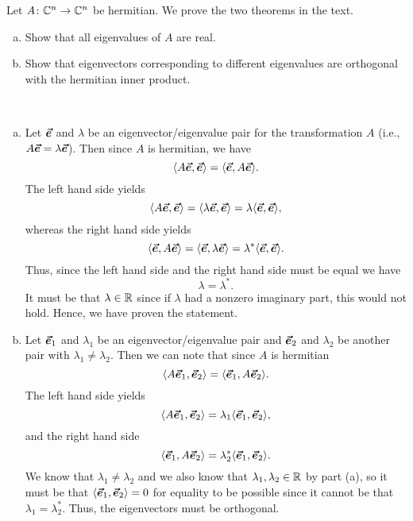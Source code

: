 \documentclass[12pt]{article} %
\begin{document}
\newpage
\begin{problem}
Let $A \colon \mathbb{C}^n \to \mathbb{C}^n$ be hermitian.  We prove the two theorems in the text.
\begin{enumerate}[(a)]
    \item Show that all eigenvalues of $A$ are real.
    \item Show that eigenvectors corresponding to different eigenvalues are orthogonal with the hermitian inner product.
\end{enumerate}
\end{problem}
\begin{solution}~
   \begin{enumerate}[(a)]
    \item Let $\boldsymbol{\vec{e}}$ and $\lambda$ be an eigenvector/eigenvalue pair for the transformation $A$ (i.e., $A\boldsymbol{\vec{e}} = \lambda \boldsymbol{\vec{e}}$).  Then since $A$ is hermitian, we have
    \[
    \langle A \boldsymbol{\vec{e}}, \boldsymbol{\vec{e}} \rangle = \langle \boldsymbol{\vec{e}}, A \boldsymbol{\vec{e}} \rangle.
    \]
    The left hand side yields
    \[
    \langle A \boldsymbol{\vec{e}}, \boldsymbol{\vec{e}} \rangle =  \langle \lambda \boldsymbol{\vec{e}},\boldsymbol{\vec{e}}\rangle = \lambda \langle  \boldsymbol{\vec{e}},\boldsymbol{\vec{e}}\rangle,
    \]
    whereas the right hand side yields
    \[
    \langle \boldsymbol{\vec{e}}, A \boldsymbol{\vec{e}} \rangle = \langle  \boldsymbol{\vec{e}}, \lambda \boldsymbol{\vec{e}}\rangle = \lambda^* \langle  \boldsymbol{\vec{e}},\boldsymbol{\vec{e}}\rangle.
    \]
    Thus, since the left hand side and the right hand side must be equal we have
    \[
        \lambda = \lambda^*.
    \]
    It must be that $\lambda \in \mathbb{R}$ since if $\lambda$ had a nonzero imaginary part, this would not hold. Hence, we have proven the statement.

    \item Let $\boldsymbol{\vec{e}}_1$ and $\lambda_1$ be an eigenvector/eigenvalue pair and $\boldsymbol{\vec{e}}_2$ and $\lambda_2$ be another pair with $\lambda_1 \neq \lambda_2$. Then we can note that since $A$ is hermitian
    \[
    \langle A \boldsymbol{\vec{e}}_1 , \boldsymbol{\vec{e}}_2 \rangle = \langle \boldsymbol{\vec{e}}_1,A \boldsymbol{\vec{e}}_2 \rangle.
    \]
    The left hand side yields
    \[
    \langle A \boldsymbol{\vec{e}}_1 , \boldsymbol{\vec{e}}_2 \rangle = \lambda_1 \langle \boldsymbol{\vec{e}}_1, \boldsymbol{\vec{e}}_2 \rangle,
    \]
    and the right hand side
    \[
    \langle \boldsymbol{\vec{e}}_1,A \boldsymbol{\vec{e}}_2 \rangle = \lambda_2^* \langle \boldsymbol{\vec{e}}_1,\boldsymbol{\vec{e}}_2 \rangle.
    \]
    We know that $\lambda_1\neq \lambda_2$ and we also know that $\lambda_1,\lambda_2 \in \mathbb{R}$ by part (a), so it must be that $\langle \boldsymbol{\vec{e}}_1,\boldsymbol{\vec{e}}_2 \rangle =0$ for equality to be possible since it cannot be that $\lambda_1 = \lambda_2^*$.  Thus, the eigenvectors must be orthogonal.
    \end{enumerate}
\end{solution}
\end{document}
